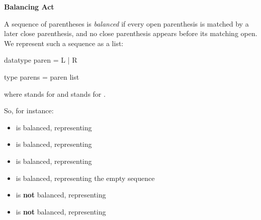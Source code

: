 \newpage
{}

\textbf{Balancing Act}

A sequence of parentheses is \textit{balanced} if every open parenthesis is
matched by a later close parenthesis, and no close parenthesis appears before
its matching open. We represent such a sequence as a list:

\begin{codeblock}
  datatype paren = L | R

  type parens = paren list
\end{codeblock}

where  stands for \code{(} and  stands for \code{)}.

So, for instance:
\begin{itemize}
  \item \code{[L, R]} is balanced, representing \code{()}
  \item \code{[L, L, R, R]} is balanced, representing \code{(())}
  \item \code{[L, R, L, R]} is balanced, representing \code{()()}
  \item \code{[]} is balanced, representing the empty sequence
  \item \code{[R, L]} is \textbf{not} balanced, representing \code{)(}
  \item \code{[L, L, R]} is \textbf{not} balanced, representing \code{((}\code{)}
\end{itemize}

